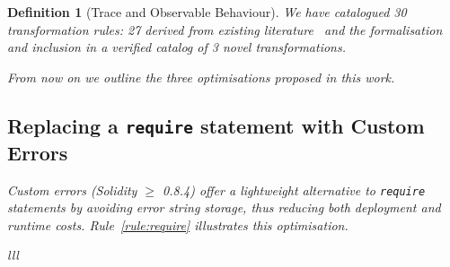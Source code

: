 \documentclass[manuscript,screen,review]{acmart}
\newtheorem{definition}{Definition}
\begin{document}
\begin{definition}[Trace and Observable Behaviour]
We have catalogued 30 transformation rules: 27 derived from existing literature~\cite{khanzadeh2023optimizing,Nelaturu2021} and the formalisation and inclusion in a verified catalog of 3 novel transformations.

From now on we outline the three optimisations proposed in this work.

\subsection{Replacing a \texttt{require} statement with Custom Errors}

Custom errors (Solidity $\ge$ 0.8.4) offer a lightweight alternative to \texttt{require} statements by avoiding error string storage, thus reducing both deployment and runtime costs. Rule~\ref{rule:require} illustrates this optimisation.

\begin{refactoring}[htb]
\begin{footnotesize}
\begin{tabular}{lll}


\end{tabular}
\end{footnotesize}
\end{refactoring}
\end{definition}
\end{document}
